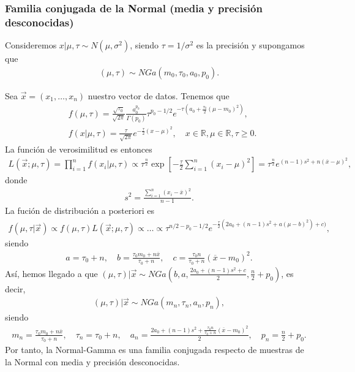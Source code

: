 \subsubsection{Familia conjugada de la Normal (media y precisión desconocidas)}
Consideremos $x | \mu,\tau \sim N(\mu,\sigma^2)$, siendo $\tau = 1/\sigma^2 $ es la precisión y supongamos que
\begin{align*}
    (\mu,\tau) \sim NGa(m_0,\tau_0,a_0,p_0).
\end{align*}

Sea $\vec{x} = (x_1,\ldots,x_n)$ nuestro vector de datos. Tenemos que
\begin{align*}
     & f(\mu,\tau) = \frac{\sqrt{\tau_0}}{\sqrt{2\pi}} \frac{a_0^{p_0}}{\Gamma(p_0)} \tau^{p_0 - 1/2} e^{-\tau\left( a_0 + \frac{\tau_0}{2}(\mu - m_0)^2 \right)}, \\
     & f(x | \mu, \tau) = \frac{\tau}{\sqrt{2\pi}} e^{-\frac{\tau}{2}(x-\mu)^2}, \quad x \in \mathbb{R}, \mu \in \mathbb{R}, \tau \ge 0.
\end{align*}
La función de verosimilitud es entonces
\begin{align*}
    L(\vec{x};\mu,\tau) = \prod_{i=1}^{n}f(x_i | \mu, \tau) \propto \tau^{\frac{n}{2}}\exp\left[ - \frac{\tau}{2} \sum_{i=1}^{n} (x_i - \mu)^2\right]
    = \tau^{\frac{n}{2}} e^{ (n-1)s^2 + n(\overline{x} -\mu)^2 },
\end{align*}
donde
\begin{align*}
    s^2 = \frac{\sum_{i=1}^{n} (x_i - \overline{x})^2}{n-1}.
\end{align*}
La fución de distribución a posteriori es
\begin{align*}
    f(\mu,\tau | \vec{x}) \propto f(\mu,\tau) L(\vec{x};\mu,\tau) \propto \ldots \propto \tau^{n/2 - p_0 - 1/2} e^{-\frac{\tau}{2}(2a_0 + (n-1)s^2 + a(\mu - b)^2) + c)},
\end{align*}
siendo
\begin{align*}
    a = \tau_0 + n, \quad b = \frac{\tau_0 m_0 + n \overline{x}}{\tau_0 + n}, \quad c = \frac{\tau_0n}{\tau_0 + n}(\overline{x} - m_0)^2.
\end{align*}
Así, hemos llegado a que $(\mu,\tau) | \vec{x} \sim NGa \left(b, a, \frac{2a_0 + (n-1)s^2 + c}{2}, \frac{n}{2} + p_0 \right)$, es decir,
\begin{align*}
    (\mu,\tau) | \vec{x} \sim NGa(m_n, \tau_n, a_n,p_n),
\end{align*}
siendo
\begin{align*}
    m_n = \frac{\tau_0 m_0 + n \overline{x}}{\tau_0 + n}, \quad \tau_n = \tau_0 + n, \quad a_n = \frac{2a_0 + (n-1)s^2 + \frac{\tau_0n}{\tau_0 + n}(\overline{x} - m_0)^2}{2}, \quad p_n = \frac{n}{2} + p_0.
\end{align*}
Por tanto, la Normal-Gamma es una familia conjugada respecto de muestras de la Normal con media y precisión desconocidas.

